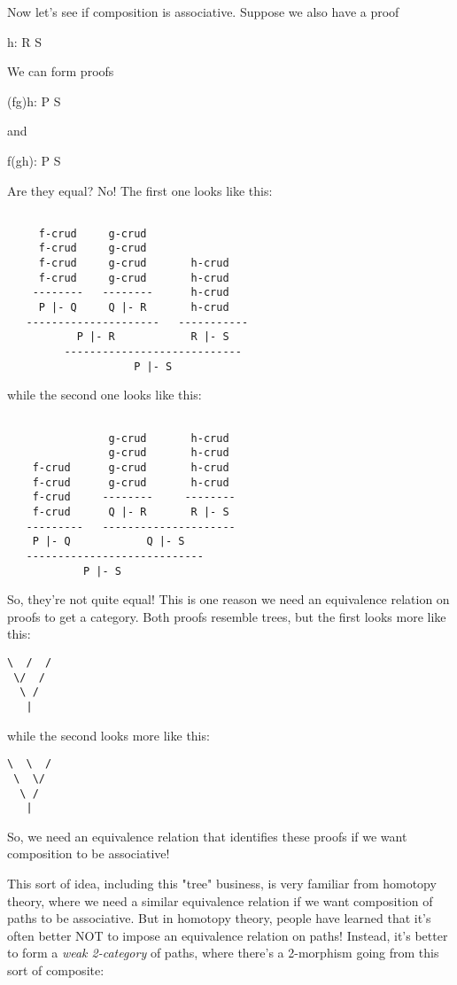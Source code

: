 Now let's see if composition is associative.  Suppose we also have a 
proof

h: R \to  S

We can form proofs

(fg)h: P \to  S

and

f(gh): P \to  S 

Are they equal?  No!  The first one looks like this:


\begin{verbatim}

     f-crud     g-crud
     f-crud     g-crud
     f-crud     g-crud       h-crud
     f-crud     g-crud       h-crud
    --------   --------      h-crud
     P |- Q     Q |- R       h-crud
   ---------------------   ----------- 
           P |- R            R |- S 
         ----------------------------
                    P |- S

\end{verbatim}
    
while the second one looks like this:


\begin{verbatim}

                g-crud       h-crud
                g-crud       h-crud
    f-crud      g-crud       h-crud
    f-crud      g-crud       h-crud
    f-crud     --------     --------      
    f-crud      Q |- R       R |- S      
   ---------   --------------------- 
    P |- Q            Q |- S 
   ----------------------------
            P |- S

\end{verbatim}
    
So, they're not quite equal!  This is one reason we need an 
equivalence relation on proofs to get a category.  Both proofs 
resemble trees, but the first looks more like this:

\begin{verbatim}
\  /  /
 \/  /
  \ /
   |
\end{verbatim}
    
while the second looks more like this:

\begin{verbatim}
\  \  /
 \  \/
  \ /
   |
\end{verbatim}
    
So, we need an equivalence relation that identifies these proofs
if we want composition to be associative! 

This sort of idea, including this "tree" business, is very familiar 
from homotopy theory, where we need a similar equivalence relation if we
want composition of paths to be associative.  But in homotopy theory, 
people have learned that it's often better NOT to impose an equivalence 
relation on paths!  Instead, it's better to form a \emph{weak 2-category} 
of paths, where there's a 2-morphism going from this sort of composite:

